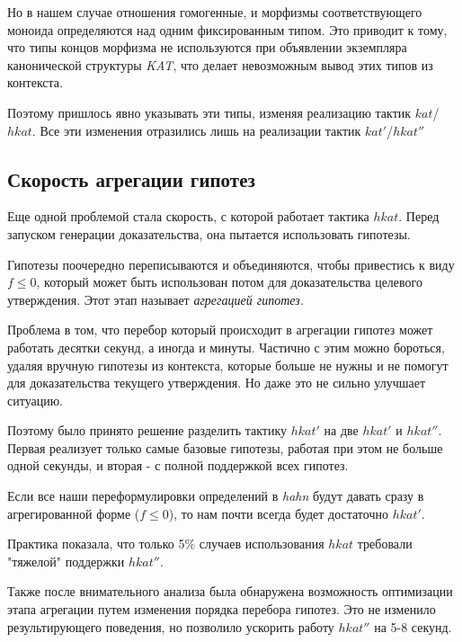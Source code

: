 \documentclass[times
              ]{itmo-student-thesis}
\begin{document}

      Но в нашем случае отношения гомогенные, и морфизмы соответствующего моноида определяются над одним фиксированным типом.
      Это приводит к тому, что типы концов морфизма не используются при объявлении экземпляра канонической структуры \textit{KAT},
      что делает невозможным вывод этих типов из контекста.

      Поэтому пришлось явно указывать эти типы, изменяя реализацию тактик $ kat $/$ hkat $.
      Все эти изменения отразились лишь на реализации тактик $ kat' $/$ hkat'' $

    \subsection{Скорость агрегации гипотез}

      Еще одной проблемой стала скорость, с которой работает тактика $ hkat $.
      Перед запуском генерации доказательства, она пытается использовать гипотезы.

      Гипотезы поочередно переписываются и объединяются, чтобы привестись к виду $ f \leq 0 $, который может быть использован потом для доказательства целевого утверждения.
      Этот этап называет \textit{агрегацией гипотез.}

      Проблема в том, что перебор который происходит в агрегации гипотез может работать десятки секунд, а иногда и минуты.
      Частично с этим можно бороться, удаляя вручную гипотезы из контекста, которые больше не нужны и не помогут для доказательства текущего утверждения.
      Но даже это не сильно улучшает ситуацию.

      Поэтому было принято решение разделить тактику $ hkat' $ на две $ hkat' $ и $ hkat'' $.
      Первая реализует только самые базовые гипотезы, работая при этом не больше одной секунды, и вторая - с полной поддержкой всех гипотез.

      Если все наши переформулировки определений в  \textit{hahn} будут давать сразу в агрегированной форме ($ f \leq 0 $),
      то нам почти всегда будет достаточно $ hkat' $.

      Практика показала, что только 5\% случаев использования $ hkat $ требовали "тяжелой" поддержки $ hkat'' $.

      Также после внимательного анализа была обнаружена возможность оптимизации этапа агрегации путем изменения порядка перебора гипотез.
      Это не изменило результирующего поведения, но позволило ускорить работу $ hkat'' $ на 5-8 секунд.
\end{document}
